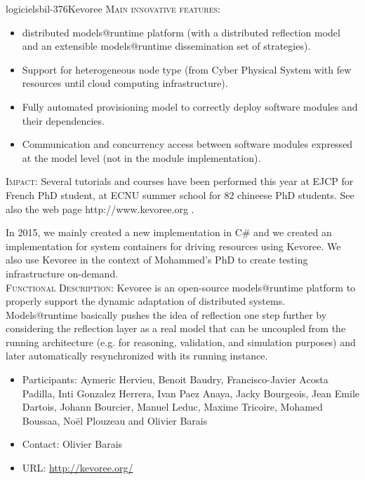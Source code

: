 \documentclass{ra2018}
\begin{document}
\begin{module}{logiciels}{bil-376}{Kevoree}
\textsc{Main innovative features:}
\begin{itemize}
	\item distributed models@runtime platform (with a distributed reflection model and an extensible models@runtime dissemination set of strategies).
	\item Support for heterogeneous node type (from Cyber Physical System with few resources until cloud computing infrastructure).
	\item Fully automated provisioning model to correctly deploy software modules and their dependencies.
	\item Communication and concurrency access between software modules expressed at the model level (not in the module implementation).
\end{itemize}


\textsc{Impact:} Several tutorials and courses have been performed this year at EJCP for French PhD student, at ECNU summer school for 82 chineese PhD students. See also the web page http://www.kevoree.org .

In 2015, we mainly created a new implementation in C\# and we created an implementation for system containers for driving resources using Kevoree. We also use Kevoree in the context of Mohammed's PhD to create testing infrastructure on-demand.\\

 \textsc{Functional Description:}  Kevoree is an open-source models@runtime platform to properly support the dynamic adaptation of distributed systems. Models@runtime basically pushes the idea of reflection one step further by considering the reflection layer as a real model that can be uncoupled from the running architecture (e.g. for reasoning, validation, and simulation purposes) and later automatically resynchronized with its running instance.\\

   \begin{itemize}
      \item Participants: Aymeric Hervieu, Benoit Baudry, Francisco-Javier Acosta Padilla, Inti Gonzalez Herrera, Ivan Paez Anaya, Jacky Bourgeois, Jean Emile Dartois, Johann Bourcier, Manuel Leduc, Maxime Tricoire, Mohamed Boussaa, Noël Plouzeau and Olivier Barais
      \item Contact: Olivier Barais
      \item URL: \url{http://kevoree.org/}
   \end{itemize}

 \end{module}
\end{document}

